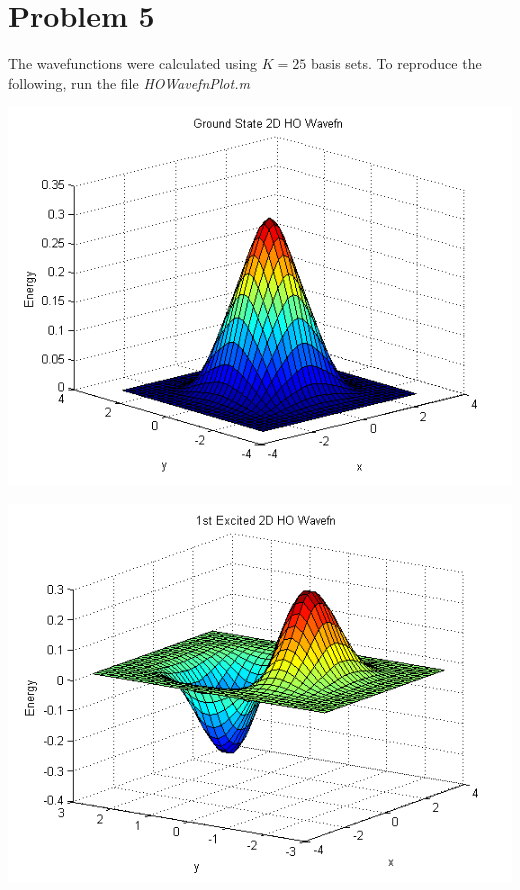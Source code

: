 \documentclass{article}
\begin{document}
\section*{Problem 5}
The wavefunctions were calculated using $K=25$ basis sets. To reproduce the following, run the file \textit{HOWavefnPlot.m}

\includegraphics{prob5ground}

\includegraphics{prob5excited}
\end{document}
